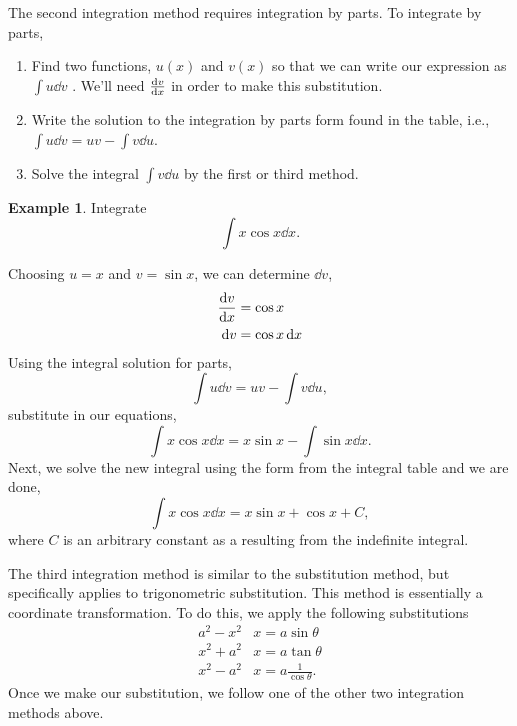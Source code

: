\documentclass[final,a4paper,12pt]{article}
\theoremstyle{definition}
\newtheorem{example}{Example}[section]
\begin{document}
The second integration method requires integration by parts.  To integrate by
parts,
\begin{enumerate}
    \item Find two functions, $u(x)$ and $v(x)$ so that we can write our
    expression as $\int u \dd{v}$ .  We'll need $\dv{v}{x}$ in order to make this
    substitution.
    \item Write the solution to the integration by parts form found in the
    table, i.e., $\int u \dd{v} = u v - \int v \dd{u}$.
    \item Solve the integral $\int v \dd{u}$ by the first or third method.
\end{enumerate}

\begin{example}
    Integrate
    \begin{equation*}
        \int x \cos x \dd{x} .
    \end{equation*}

    Choosing $u = x$ and $v = \sin x$, we can determine $\dd{v}$,
    \begin{align*}
        \dv{v}{x} &= \cos x \\
        \dd{v} &= \cos x \dd{x}
    \end{align*}
    Using the integral solution for parts,
    \begin{equation}
        \int u \dd{v} = u v - \int v \dd{u} ,
    \end{equation}
    substitute in our equations,
    \begin{equation*}
        \int x \cos x \dd{x} = x \sin x - \int \sin x \dd{x} .
    \end{equation*}
    Next, we solve the new integral using the form from the integral table and
    we are done,
    \begin{equation*}
        \int x \cos x \dd{x} = x \sin x + \cos x + C,
    \end{equation*}
    where $C$ is an arbitrary constant as a resulting from the indefinite
    integral.
\end{example}

The third integration method is similar to the substitution method, but
specifically applies to trigonometric substitution.  This method is essentially
a coordinate transformation.  To do this, we apply the following substitutions
\begin{align}
    a^2 - x^2 & x = a \sin \theta \\
    x^2 + a^2 & x = a \tan \theta \\
    x^2 - a^2 & x = a \frac{1}{\cos \theta} .
\end{align}
Once we make our substitution, we follow one of the other two integration
methods above.
\end{document}
